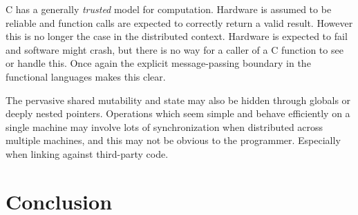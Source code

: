 \documentclass[10pt,a4paper,twocolumn]{article}
\begin{document}
C has a generally \emph{trusted} model for computation. Hardware is assumed to
be reliable and function calls are expected to correctly return a valid result.
However this is no longer the case in the distributed context. Hardware is
expected to fail and software might crash, but there is no way for a caller of a
C function to see or handle this. Once again the explicit message-passing
boundary in the functional languages makes this clear.

The pervasive shared mutability and state may also be hidden through globals or
deeply nested pointers. Operations which seem simple and behave efficiently on a
single machine may involve lots of synchronization when distributed across
multiple machines, and this may not be obvious to the programmer. Especially
when linking against third-party code.

\section{Conclusion}



\small



\end{document}
